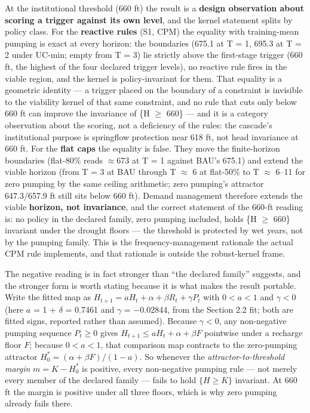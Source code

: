 At the institutional threshold (660 ft) the result is a \textbf{design
observation about scoring a trigger against its own level}, and the
kernel statement splits by policy class. For the \textbf{reactive rules}
(S1, CPM) the equality with training-mean pumping is exact at every
horizon: the boundaries (675.1 at T = 1, 695.3 at T = 2 under UC-min;
empty from T = 3) lie strictly above the first-stage trigger (660 ft,
the highest of the four declared trigger levels), no reactive rule fires
in the viable region, and the kernel is policy-invariant for them. That
equality is a geometric identity --- a trigger placed on the boundary of
a constraint is invisible to the viability kernel of that same
constraint, and no rule that cuts only below 660 ft can improve the
invariance of \{H \ensuremath{\geq} 660\} --- and it is a category observation about the
scoring, not a deficiency of the rules: the cascade's institutional
purpose is springflow protection near 618 ft, not head invariance at 660
ft. For the \textbf{flat caps} the equality is false. They move the
finite-horizon boundaries (flat-80\% reads \ensuremath{\approx}673 at T = 1 against BAU's
675.1) and extend the viable horizon (from T = 3 at BAU through T \ensuremath{\approx} 6 at
flat-50\% to T \ensuremath{\approx} 6--11 for zero pumping by the same ceiling arithmetic;
zero pumping's attractor 647.3/657.9 ft still sits below 660 ft). Demand
management therefore extends the viable \textbf{horizon, not
invariance}, and the correct statement of the 660-ft reading is: no
policy in the declared family, zero pumping included, holds \{H \ensuremath{\geq} 660\}
invariant under the drought floors --- the threshold is protected by wet
years, not by the pumping family. This is the frequency-management
rationale the actual CPM rule implements, and that rationale is outside
the robust-kernel frame.

The negative reading is in fact stronger than ``the declared family''
suggests, and the stronger form is worth stating because it is what
makes the result portable. Write the fitted map as \(H_{t+1} = aH_t +
\alpha + \beta R_t + \gamma P_t\) with \(0 < a < 1\) and \(\gamma < 0\)
(here \(a\) = 1 + \(\delta\) = 0.7461 and \(\gamma\) = \ensuremath{-}0.02844, from the
Section 2.2 fit; both are fitted signs, reported rather than assumed). Because \(\gamma < 0\), any
non-negative pumping sequence \(P_t \geq 0\) gives \(H_{t+1} \leq aH_t +
\alpha + \beta F\) pointwise under a recharge floor \(F\); because \(0 < a
< 1\), that comparison map contracts to the zero-pumping attractor
\(H^{\ast}_0 = (\alpha + \beta F)/(1-a)\). So whenever the
\emph{attractor-to-threshold margin} \(m = K - H^{\ast}_0\) is positive,
every non-negative pumping rule --- not merely every member of the
declared family --- fails to hold \(\{H \geq K\}\) invariant. At 660 ft
the margin is positive under all three floors, which is why zero pumping
already fails there.

